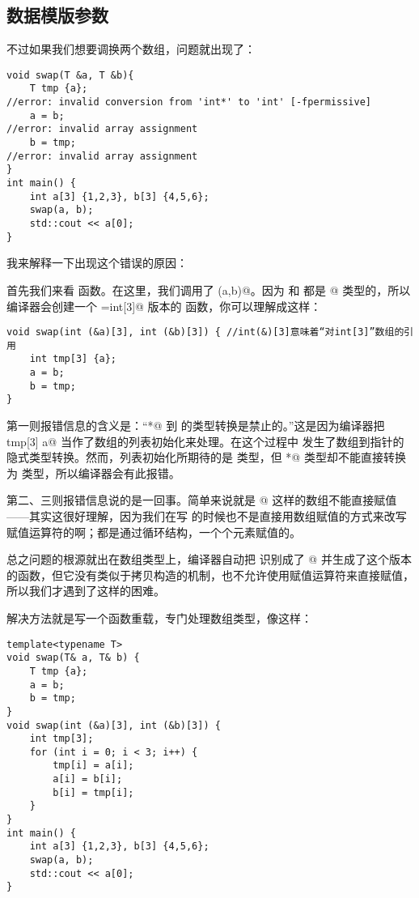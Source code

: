 \subsection*{数据模版参数}
不过如果我们想要调换两个数组，问题就出现了：
\begin{lstlisting}
void swap(T &a, T &b){
    T tmp {a};
//error: invalid conversion from 'int*' to 'int' [-fpermissive]
    a = b;
//error: invalid array assignment
    b = tmp;
//error: invalid array assignment
}
int main() {
    int a[3] {1,2,3}, b[3] {4,5,6};
    swap(a, b);
    std::cout << a[0];
}
\end{lstlisting}
我来解释一下出现这个错误的原因：\par
首先我们来看 \lstinline@main@ 函数。在这里，我们调用了 \lstinline@swap(a,b)@。因为 \lstinline@a@ 和 \lstinline@b@ 都是 \lstinline@int[3]@ 类型的，所以编译器会创建一个 \lstinline@T=int[3]@ 版本的 \lstinline@swap@ 函数，你可以理解成这样：
\begin{lstlisting}
void swap(int (&a)[3], int (&b)[3]) { //int(&)[3]意味着“对int[3]”数组的引用
    int tmp[3] {a};
    a = b;
    b = tmp;
}
\end{lstlisting}
第一则报错信息的含义是：``\lstinline@int*@ 到 \lstinline@int@ 的类型转换是禁止的。''这是因为编译器把 \lstinline@int tmp[3] {a}@ 当作了数组的列表初始化来处理。在这个过程中 \lstinline@a@ 发生了数组到指针的隐式类型转换。然而，列表初始化所期待的是 \lstinline@int@ 类型，但 \lstinline@int*@ 类型却不能直接转换为 \lstinline@int@ 类型，所以编译器会有此报错。\par
第二、三则报错信息说的是一回事。简单来说就是 \lstinline@int[3]@ 这样的数组不能直接赋值——其实这很好理解，因为我们在写 \lstinline@valarri@ 的时候也不是直接用数组赋值的方式来改写赋值运算符的啊；都是通过循环结构，一个个元素赋值的。\par
总之问题的根源就出在数组类型上，编译器自动把 \lstinline@T@ 识别成了 \lstinline@int[3]@ 并生成了这个版本的函数，但它没有类似于拷贝构造的机制，也不允许使用赋值运算符来直接赋值，所以我们才遇到了这样的困难。\par
解决方法就是写一个函数重载，专门处理数组类型，像这样：
\begin{lstlisting}
template<typename T>
void swap(T& a, T& b) {
    T tmp {a};
    a = b;
    b = tmp;
}
void swap(int (&a)[3], int (&b)[3]) {
    int tmp[3];
    for (int i = 0; i < 3; i++) {
        tmp[i] = a[i];
        a[i] = b[i];
        b[i] = tmp[i];
    }
}
int main() {
    int a[3] {1,2,3}, b[3] {4,5,6};
    swap(a, b);
    std::cout << a[0];
}
\end{lstlisting}
